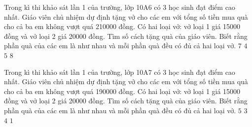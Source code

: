 \begin{ex}
 Trong kì thi khảo sát lần 1 của trường, lớp 10A6 có 3 học sinh đạt điểm cao nhất. Giáo viên chủ nhiệm dự định tặng vở cho các em với tổng số tiền mua quà cho cả ba em không vượt quá 210000 đồng. Có hai loại vở: vở loại 1 giá 15000 đồng và vở loại 2 giá 20000 đồng. Tìm số cách tặng quà của giáo viên. Biết rằng phần quà của các em là như nhau và mỗi phần quà đều có đủ cả hai loại vở.
\choice
{${7}$}
{${4}$}
{\True ${5}$}
{${8}$}
\end{ex}

\begin{ex}
 Trong kì thi khảo sát lần 1 của trường, lớp 10A7 có 3 học sinh đạt điểm cao nhất. Giáo viên chủ nhiệm dự định tặng vở cho các em với tổng số tiền mua quà cho cả ba em không vượt quá 190000 đồng. Có hai loại vở: vở loại 1 giá 15000 đồng và vở loại 2 giá 20000 đồng. Tìm số cách tặng quà của giáo viên. Biết rằng phần quà của các em là như nhau và mỗi phần quà đều có đủ cả hai loại vở.
\choice
{${5}$}
{\True ${3}$}
{${4}$}
{${1}$}
\end{ex}

